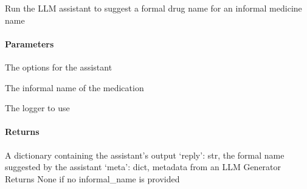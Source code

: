 \documentclass[letterpaper,10pt,english]{sphinxmanual}
\begin{document}
\begin{fulllineitems}
\label{\detokenize{autoapi/assistant/index:assistant.run}}
\pysigstartsignatures
{}
\pysigstopsignatures
\sphinxAtStartPar
Run the LLM assistant to suggest a formal drug name for an informal medicine name


\paragraph{Parameters}
\label{\detokenize{autoapi/assistant/index:parameters}}\begin{description}
\sphinxAtStartPar
The options for the assistant

\sphinxAtStartPar
The informal name of the medication

\sphinxAtStartPar
The logger to use

\end{description}


\paragraph{Returns}
\label{\detokenize{autoapi/assistant/index:returns}}\begin{description}
\sphinxAtStartPar
A dictionary containing the assistant’s output
\sphinxhyphen{} ‘reply’: str, the formal name suggested by the assistant
\sphinxhyphen{} ‘meta’: dict, metadata from an LLM Generator
Returns None if no informal\_name is provided

\end{description}

\end{fulllineitems}
\end{document}
